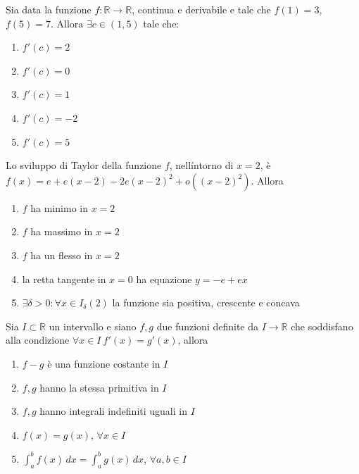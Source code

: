 \begin{quiz}
Sia data la funzione $f:\mathbb R\to\mathbb R$, continua e derivabile e tale che $f(1)=3$, $f(5)=7$. Allora $\exists c\in(1,5)$ tale che:
\begin{enumerate}
\item $f\prime(c)=2$
\item $f\prime(c)=0$
\item $f\prime(c)=1$
\item $f\prime(c)=-2$
\item $f\prime(c)=5$
\end{enumerate}
\end{quiz}

\begin{quiz}
Lo sviluppo di Taylor della funzione $f$, nell\'intorno di $x=2$, \`e $f(x)=e+e(x-2)-2e(x-2)^2+o((x-2)^2)$. Allora
\begin{enumerate}
\item $f$ ha minimo in $x=2$
\item $f$ ha massimo in $x=2$
\item $f$ ha un flesso in $x=2$
\item la retta tangente in $x=0$ ha equazione $y=-e+ex$
\item $\exists\delta>0:\forall x\in I_\delta(2)$ la funzione sia positiva, crescente e concava
\end{enumerate}
\end{quiz}

\begin{quiz}
Sia $I\subset\mathbb R$ un intervallo e siano $f,g$ due funzioni definite da $I\to\mathbb R$ che soddisfano alla condizione $\forall x\in I\ f\prime(x)=g\prime(x)$, allora
\begin{enumerate}
\item $f-g$ \`e una funzione costante in $I$
\item $f,g$ hanno la stessa primitiva in $I$
\item $f,g$ hanno integrali indefiniti uguali in $I$
\item $f(x)=g(x)$, $\forall x\in I$
\item $\int_a^b f(x)\,dx=\int_a^b g(x)\,dx$, $\forall a,b\in I$
\end{enumerate}
\end{quiz}


